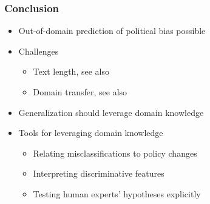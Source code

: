 \documentclass[]{beamer}
\begin{document}
\begin{frame}\frametitle{Conclusion}
\begin{itemize}
\item Out-of-domain prediction of political bias possible
\item Challenges
\begin{itemize}
\item Text length, see also \cite{Hirst2014}
\item Domain transfer, see also \cite{Hirst2014, Yu2008}
\end{itemize}
\item Generalization should leverage domain knowledge
\item Tools for leveraging domain knowledge
\begin{itemize}
\item Relating misclassifications to policy changes
\item Interpreting discriminative features
\item Testing human experts' hypotheses explicitly
\end{itemize}
\end{itemize}
\end{frame}
\end{document}
